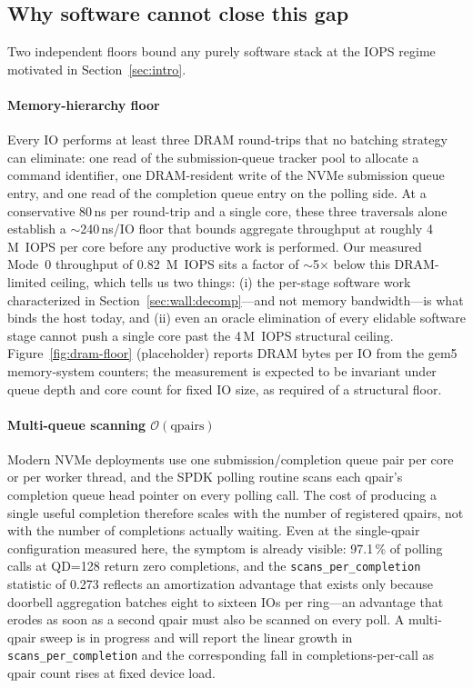 \documentclass[journal]{IEEEtran}
\begin{document}
\subsection{Why software cannot close this gap}
\label{sec:wall:floors}

Two independent floors bound any purely software stack at the IOPS
regime motivated in Section~\ref{sec:intro}.

\paragraph*{Memory-hierarchy floor}
Every IO performs at least three DRAM round-trips that no batching
strategy can eliminate: one read of the submission-queue tracker pool to
allocate a command identifier, one DRAM-resident write of the NVMe
submission queue entry, and one read of the completion queue entry on
the polling side. At a conservative 80\,ns per round-trip and a single
core, these three traversals alone establish a $\sim$240\,ns/IO floor
that bounds aggregate throughput at roughly 4\,M~IOPS per core before
any productive work is performed. Our measured Mode~0 throughput of
0.82~M~IOPS sits a factor of $\sim$5$\times$ below this DRAM-limited
ceiling, which tells us two things: (i) the per-stage software work
characterized in Section~\ref{sec:wall:decomp}---and not memory
bandwidth---is what binds the host today, and (ii) even an oracle
elimination of every elidable software stage cannot push a single core
past the 4\,M~IOPS structural ceiling. Figure~\ref{fig:dram-floor}
(placeholder) reports DRAM bytes per IO from the gem5 memory-system
counters; the measurement is expected to be invariant under queue depth
and core count for fixed IO size, as required of a structural floor.

\paragraph*{Multi-queue scanning $\mathcal{O}(\textrm{qpairs})$}
Modern NVMe deployments use one submission/completion queue pair per
core or per worker thread, and the SPDK polling routine scans each
qpair's completion queue head pointer on every polling call. The cost
of producing a single useful completion therefore scales with the
number of registered qpairs, not with the number of completions
actually waiting. Even at the single-qpair configuration measured here,
the symptom is already visible: 97.1\,\% of polling calls at QD=128
return zero completions, and the
\texttt{scans\_per\_completion} statistic of 0.273 reflects an
amortization advantage that exists only because doorbell aggregation
batches eight to sixteen IOs per ring---an advantage that erodes as
soon as a second qpair must also be scanned on every poll. A multi-qpair
sweep is in progress and will report the linear growth in
\texttt{scans\_per\_completion} and the corresponding fall in
completions-per-call as qpair count rises at fixed device load.
\end{document}
